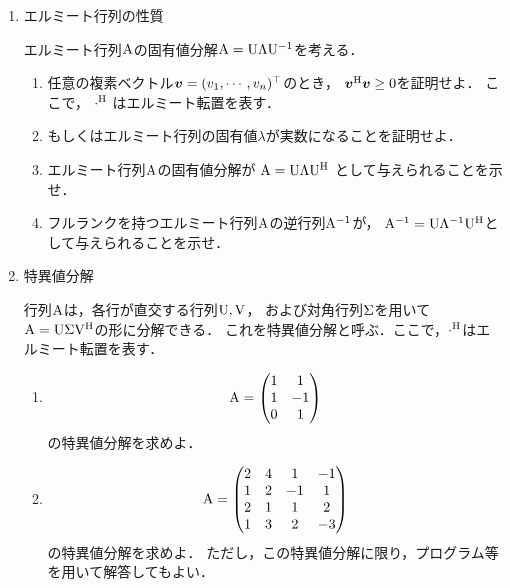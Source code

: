\begin{enumerate}[label=問\arabic*.]
  \item エルミート行列の性質

  \vspace{1mm}
  エルミート行列$\mathrm{A}$の固有値分解$\mathrm{A} = \mathrm{U}\mathrm{\Lambda}\mathrm{U}^{-1}$を考える．
  \begin{enumerate}[label=(\roman*)]
    \item 任意の複素ベクトル$\boldsymbol{v}=(v_1, \cdots, v_n)^\top$のとき，
      $\boldsymbol{v}^\mathrm{H} \boldsymbol{v} \geq 0$を証明せよ．
      ここで， $\cdot^\mathrm{H}$ はエルミート転置を表す．
    \item もしくはエルミート行列の固有値$\lambda$が実数になることを証明せよ．
    \item エルミート行列$\mathrm{A}$の固有値分解が
      $\mathrm{A} = \mathrm{U}\mathrm{\Lambda}\mathrm{U}^\mathrm{H}$ として与えられることを示せ．
    \item フルランクを持つエルミート行列$\mathrm{A}$の逆行列$\mathrm{A}^{-1}$が，
      $\mathrm{A}^{-1} = \mathrm{U}\mathrm{\Lambda}^{-1}\mathrm{U}^\mathrm{H}$として与えられることを示せ．
  \end{enumerate}

  \item 特異値分解 \label{linalg:svd}

  \vspace{1mm}
  行列$\mathrm{A}$は，各行が直交する行列$\mathrm{U}, \mathrm{V}$，
  および対角行列$\mathrm{\Sigma}$を用いて
  $\mathrm{A}=\mathrm{U}\mathrm{\Sigma}\mathrm{V}^\mathrm{H}$の形に分解できる．
  これを特異値分解と呼ぶ．ここで，$\cdot^\mathrm{H}$はエルミート転置を表す．
  \begin{enumerate}[label=(\roman*)]
    \item
      \begin{equation}
        \mathrm{A} =
          \begin{pmatrix}
            1 & 1 \\
            1 & -1 \\
            0 & 1
          \end{pmatrix}
      \end{equation}
      の特異値分解を求めよ．
    \item
      \begin{equation}
        \mathrm{A} =
          \begin{pmatrix}
            2 & 4 & 1 &-1 \\
            1 & 2 & -1 & 1 \\
            2 & 1 & 1 & 2 \\
            1 & 3 & 2 & -3
          \end{pmatrix}
      \end{equation}の特異値分解を求めよ．
      ただし，この特異値分解に限り，プログラム等を用いて解答してもよい．
  \end{enumerate}


\end{enumerate}
